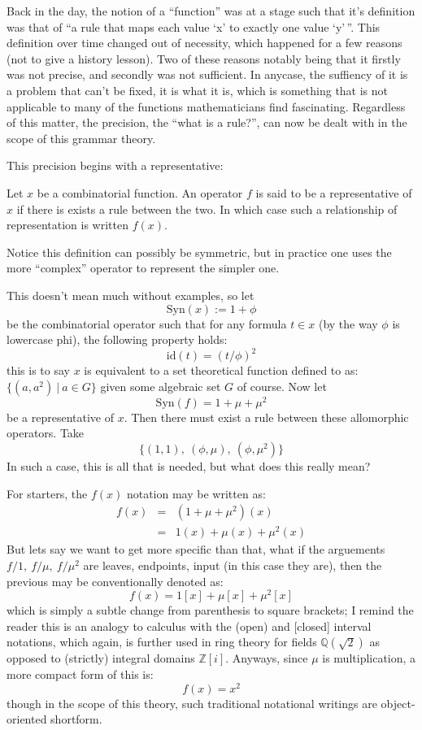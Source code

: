 \documentclass[twoside]{article}
\newenvironment{definition}[1][Definition]{\begin{trivlist}
\item[\hskip \labelsep {\bfseries #1}]}{\end{trivlist}}
\begin{document}
Back in the day, the notion of a ``function'' was at a stage such that it's definition was that of ``a rule that maps
each value `x' to exactly one value `y'\,''.  This definition over time changed out of necessity, which happened for
a few reasons (not to give a history lesson).  Two of these reasons notably being that it firstly was not precise, and
secondly was not sufficient.  In anycase, the suffiency of it is a problem that can't be fixed, it is what it is,
which is something that is not applicable to many of the functions mathematicians find fascinating.  Regardless of
this matter, the precision, the ``what is a rule?'', can now be dealt with in the scope of this grammar theory.

This precision begins with a representative:

\begin{definition}[Representative]

Let $ x $ be a combinatorial function.  An operator $ f $ is said to be a representative of $ x $ if there
is exists a rule between the two.  In which case such a relationship of representation is written $ f(x) $.

\end{definition}
Notice this definition can possibly be symmetric, but in practice one uses the more ``complex'' operator to represent
the simpler one.

This doesn't mean much without examples, so let
$$ \mbox{Syn}(x):=1+\phi $$
be the combinatorial operator such that for any formula $ t\in x $ (by the way $ \phi $ is lowercase phi),
the following property holds:
$$ \mbox{id}(t)=(t/\phi)^2 $$
this is to say $ x $ is equivalent to a set theoretical function defined to as: $ \{(a, a^2)\ |\ a\in G\} $ given
some algebraic set $ G $ of course.  Now let
$$  \mbox{Syn}(f)=1+\mu+\mu^2 $$
be a representative of $ x $.  Then there must exist a rule between these allomorphic operators.  Take
$$ \{(1, 1),\ (\phi, \mu),\ (\phi, \mu^2)\} $$
In such a case, this is all that is needed, but what does this really mean?

For starters, the $ f(x) $ notation may be written as:
\begin{eqnarray*}
f(x)    & = & (1+\mu+\mu^2)(x)\\
	& = & 1(x)+\mu(x)+\mu^2(x)
\end{eqnarray*}
But lets say we want to get more specific than that, what if the arguements $ f/1,\ f/\mu,\ f/\mu^2 $ are leaves,
endpoints, input (in this case they are), then the previous may be conventionally denoted as:
$$ f(x)=1[x]+\mu[x]+\mu^2[x] $$
which is simply a subtle change from parenthesis to square brackets; I remind the reader this is an analogy to calculus
with the (open) and [closed] interval notations, which again, is further used in ring theory for fields
$ \mathbb{Q}(\sqrt 2) $ as opposed to (strictly) integral domains $ \mathbb{Z}[i] $.  Anyways, since $ \mu $ is
multiplication, a more compact form of this is:
$$ f(x)=x^2 $$
though in the scope of this theory, such traditional notational writings are object-oriented shortform.
\end{document}
